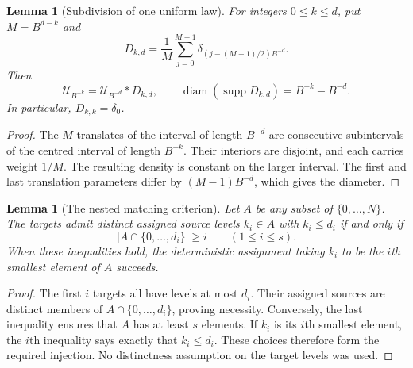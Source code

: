 \documentclass[11pt,letterpaper]{article}
\newtheorem{lemma}[theorem]{Lemma}
\theoremstyle{definition}
\theoremstyle{remark}
\newcommand{\Un}{\mathcal U}
\begin{document}
\begin{lemma}[Subdivision of one uniform law]
\label{hall:subdivision}
For integers $0\le k\le d$, put $M=B^{d-k}$ and
\[
 D_{k,d}=\frac1M\sum_{j=0}^{M-1}
   \delta_{(j-(M-1)/2)B^{-d}}.
\]
Then
\[
 \Un_{B^{-k}}=\Un_{B^{-d}}*D_{k,d},
 \qquad
 \operatorname{diam}(\operatorname{supp}D_{k,d})
      =B^{-k}-B^{-d}.
\]
In particular, $D_{k,k}=\delta_0$.
\end{lemma}

\begin{proof}
The $M$ translates of the interval of length $B^{-d}$ are consecutive
subintervals of the centred interval of length $B^{-k}$. Their interiors
are disjoint, and each carries weight $1/M$. The resulting density is
constant on the larger interval. The first and last translation parameters
differ by $(M-1)B^{-d}$, which gives the diameter.
\end{proof}

\begin{lemma}[The nested matching criterion]
\label{hall:matching}
Let $A$ be any subset of $\{0,\ldots,N\}$. The targets admit distinct
assigned source levels $k_i\in A$ with $k_i\le d_i$ if and only if
\begin{equation}
  |A\cap\{0,\ldots,d_i\}|\ge i
  \qquad(1\le i\le s).
  \label{hall:prefix}
\end{equation}
When these inequalities hold, the deterministic assignment taking $k_i$
to be the $i$th smallest element of $A$ succeeds.
\end{lemma}

\begin{proof}
The first $i$ targets all have levels at most $d_i$. Their assigned sources
are distinct members of $A\cap\{0,\ldots,d_i\}$, proving necessity.
Conversely, the last inequality ensures that $A$ has at least $s$ elements.
If $k_i$ is its $i$th smallest element, the $i$th inequality says exactly
that $k_i\le d_i$. These choices therefore form the required injection.
No distinctness assumption on the target levels was used.
\end{proof}
\end{document}
